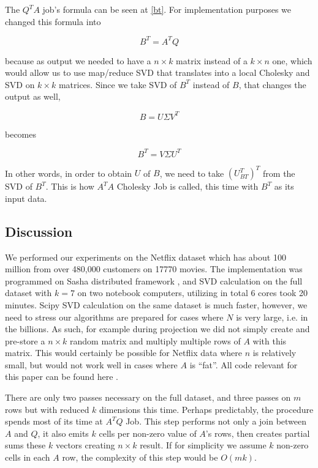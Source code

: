 \documentclass[11pt]{article}
\begin{document}
The $Q^TA$ job's formula can be seen at \ref{bt}. For implementation
purposes we changed this formula into

$$ B^T = A^TQ $$

because as output we needed to have a $n \times k$ matrix instead of a $k
\times n$ one, which would allow us to use map/reduce SVD that translates
into a local Cholesky and SVD on $k \times k$ matrices. Since we take SVD
of $B^T$ instead of $B$, that changes the output as well, 

$$ B = U\Sigma V^T $$

becomes

$$ B^T = V\Sigma U^T $$

In other words, in order to obtain $U$ of $B$, we need to take
$(U_{BT}^T)^T$ from the SVD of $B^T$. This is how $A^TA$ Cholesky Job is
called, this time with $B^T$ as its input data.

\subsection{Discussion}

We performed our experiments on the Netflix dataset which has about 100
million from over 480,000 customers on 17770 movies. The implementation was
programmed on Sasha distributed framework \cite{bayramli1}, and SVD
calculation on the full dataset with $k=7$ on two notebook computers,
utilizing in total 6 cores took 20 minutes. Scipy SVD calculation on the
same dataset is much faster, however, we need to stress our algorithms are
prepared for cases where $N$ is very large, i.e. in the billions. As such,
for example during projection we did not simply create and pre-store a $n
\times k$ random matrix and multiply multiple rows of $A$ with this
matrix. This would certainly be possible for Netflix data where $n$ is
relatively small, but would not work well in cases where $A$ is ``fat''.
All code relevant for this paper can be found here \cite{bayramli2}.

There are only two passes necessary on the full dataset, and three passes
on $m$ rows but with reduced $k$ dimensions this time.  Perhaps
predictably, the procedure spends most of its time at $A^TQ$ Job. This step
performs not only a join between $A$ and $Q$, it also emits $k$ cells per
non-zero value of $A$'s rows, then creates partial sums these $k$ vectors
creating $n \times k$ result. If for simplicity we assume $k$ non-zero
cells in each $A$ row, the complexity of this step would be $O(mk)$.
\end{document}
